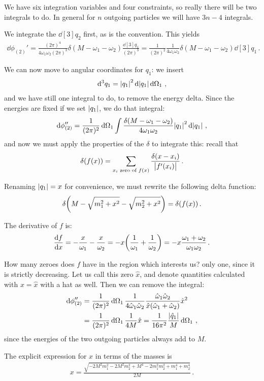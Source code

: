 \documentclass[main.tex]{subfiles}
\begin{document}
We have six integration variables and four constraints, so really there will be two integrals to do. In general for \(n\) outgoing particles we will have \(3n - 4\) integrals. 

We integrate the \(\dd[3]{q_2 }\) first, as is the convention. This yields 
%
\begin{align}
\dd{\phi}_{(2)}' 
= \frac{(2\pi )^{4}}{4 \omega_1 \omega_2 (2 \pi )^3 } \delta (M - \omega_1 - \omega_2 ) \frac{ \dd[3]{q_1 }}{(2 \pi )^3} 
= \frac{1}{(2\pi )^2} \frac{1}{4 \omega_1 \omega_2 } \delta (M - \omega_1 - \omega_2 ) \dd[3]{q_1 }
\,.
\end{align}

We can now move to angular coordinates for \(q_1 \): we insert 
%
\begin{align}
\dd[3]{q_1 } = \abs{q_1 }^2 \dd{ \abs{q_1 }} \dd{\Omega_1 }
\,,
\end{align}
%
and we have still one integral to do, to remove the energy delta.
Since the energies are fixed if we set \(\abs{q_1 }\), we do that integral: 
%
\begin{align}
\dd{\phi }_{(2)}'' = \frac{1}{(2\pi )^2}
\dd{\Omega_1 }
\int \frac{\delta (M - \omega_1 - \omega_2 )}{4 \omega_1 \omega_2 }\abs{q_1 }^2 \dd{ \abs{q_1 }}
\,,
\end{align}
%
and now we must apply the properties of the \(\delta\) to integrate this: recall that 
%
\begin{align}
\delta (f(x)) = \sum _{x_i \text{ zero of } f(x)}
\frac{ \delta (x- x_i)}{\abs{f'(x_i)}}
\,.
\end{align}

Renaming \(\abs{q_1 } = x\) for convenience, we must rewrite the following delta function: 
%
\begin{align}
\delta \qty(M - \sqrt{m_1^2 + x^2} - \sqrt{m_2^2 + x^2}) = \delta (f(x))
\,.
\end{align}

The derivative of \(f\) is:
%
\begin{align}
\dv{f}{x} = - \frac{x}{\omega_1 } - \frac{x}{\omega_2 } = - x \qty( \frac{1}{\omega_1 } + \frac{1}{\omega_2 }) 
= - x \frac{\omega_1 + \omega_2 }{\omega_1 \omega_2 }
\,.
\end{align}

How many zeroes does \(f\) have in the region which interests us? only one, since it is strictly decreasing. 
Let us call this zero \(\hat{x}\), and denote quantities calculated with \(x = \hat{x}\) with a hat as well. Then we can remove the integral: 
%
\begin{align}
\dd{\phi }_{(2)}'' &= \frac{1}{(2\pi )^2}
\dd{\Omega_1 }
\frac{1}{4 \hat{\omega}_{1} \hat{\omega}_{2}} \frac{\hat{\omega}_{1} \hat{\omega}_{2}}{\hat{x} (\hat{\omega}_{1} + \hat{\omega}_{2})}
\hat{x}^2  \\
&= \frac{1}{(2\pi )^2}
\dd{\Omega_1 }
\frac{1}{4M} \hat{x} 
= \frac{1}{16 \pi^2} \frac{\abs{\hat{q}_{1}}}{M} \dd{\Omega_1 }
\,,
\end{align}
%
since the energies of the two outgoing particles always add to \(M\). 

The explicit expression for \(x\) in terms of the masses is 
%
\begin{align}
x = \frac{\sqrt{-2 M^2 m_1^2-2 M^2 m_2^2+M^4-2 m_1^2 m_2^2+m_1^4+m_2^4}}{2 M}
\,.
\end{align}
%
\end{document}
